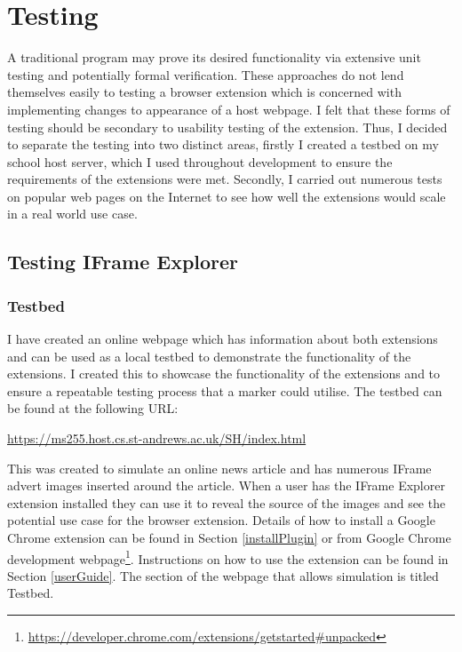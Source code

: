 \documentclass[12pt]{article}
\begin{document}
\pagebreak

\section{Testing} \label{testing}
A traditional program may prove its desired functionality via extensive unit testing and potentially formal verification. These approaches do not lend themselves easily to testing a browser extension which is concerned with implementing changes to appearance of a host webpage. I felt that these forms of testing should be secondary to usability testing of the extension. Thus, I decided to separate the testing into two distinct areas, firstly I created a testbed on my school host server, which I used throughout development to ensure the requirements of the extensions were met. Secondly, I carried out numerous tests on popular web pages on the Internet to see how well the extensions would scale in a real world use case. 

\subsection{Testing IFrame Explorer}

\subsubsection{Testbed}
I have created an online webpage which has information about both extensions and can be used as a local testbed to demonstrate the functionality of the extensions. I created this to showcase the functionality of the extensions and to ensure a repeatable testing process that a marker could utilise. The testbed can be found at the following URL: 

\begin{center}
\url{https://ms255.host.cs.st-andrews.ac.uk/SH/index.html}
\end{center}

This was created to simulate an online news article and has numerous IFrame advert images inserted around the article. When a user has the IFrame Explorer extension installed they can use it to reveal the source of the images and see the potential use case for the browser extension. Details of how to install a Google Chrome extension can be found in Section \ref{installPlugin} or from Google Chrome development webpage\footnote{\url{https://developer.chrome.com/extensions/getstarted\#unpacked}}. Instructions on how to use the extension can be found in Section \ref{userGuide}. The section of the webpage that allows simulation is titled Testbed. 
\end{document}
